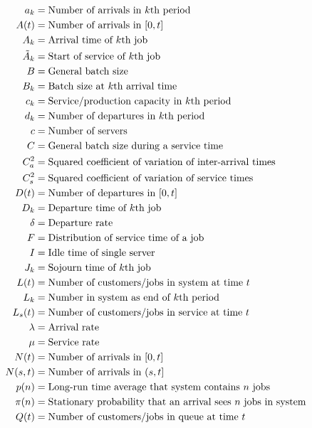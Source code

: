 \documentclass[queueing-book.tex]{subfiles}
\begin{document}
\begin{align*}
 a_k &= \text{Number of arrivals in~$k$th period} \\
 A(t) &= \text{Number of arrivals in $[0,t]$} \\
 A_k &= \text{Arrival time of~$k$th job} \\
 \tilde A_{k} &= \text{Start of service of~$k$th job} \\
 B &= \text{General batch size} \\
 B_k &= \text{Batch size  at  $k$th arrival time} \\
 c_k &= \text{Service/production capacity in~$k$th period} \\
 d_k &= \text{Number of departures in~$k$th period} \\
 c &= \text{Number of servers} \\
 C &= \text{General batch size during a service time} \\
 C_a^2 &= \text{Squared coefficient of variation of  inter-arrival times} \\
 C_s^2 &= \text{Squared coefficient of variation of  service times} \\
 D(t) &= \text{Number of departures in $[0,t]$} \\
 D_k &= \text{Departure time of~$k$th job} \\
 \delta &= \text{Departure rate} \\
 F &= \text{Distribution of  service time of a job} \\
 I &= \text{Idle time of single server} \\
\J_k &= \text{Sojourn time of~$k$th job} \\
 \L(t) &= \text{Number of customers/jobs in  system at time~$t$} \\
 \L_k &= \text{Number in  system as  end of~$k$th period} \\
 \Ls(t) &= \text{Number of customers/jobs in service at time~$t$} \\
 \lambda &= \text{Arrival rate} \\
 \mu &= \text{Service rate} \\
 N(t) &= \text{Number of arrivals in $[0,t]$} \\
 N(s,t) &= \text{Number of arrivals in $(s,t]$} \\
 p(n) &= \text{Long-run time average that  system contains~$n$ jobs} \\
 \pi(n) &= \text{Stationary probability that an arrival sees~$n$ jobs in  system} \\
 \QQ(t) &= \text{Number of customers/jobs in queue at time~$t$} \\

\end{align*}
\end{document}
